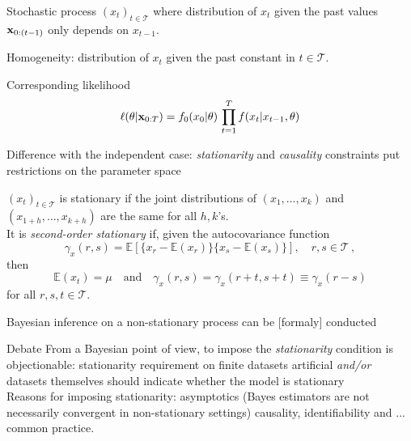 \begin{slide}
Stochastic process $(x_t)_{t\in\mathcal{T}}$
where distribution of $x_t$ given the past values $\mathbf{x}_{0:(t-1)}$
only depends on $x_{t-1}$.

Homogeneity:  distribution of $x_t$ given the past constant in
$t\in\mathcal{T}$.

\vs\pause
Corresponding likelihood
$$
\ell(\theta|\mathbf{x}_{0:T}) = f_0(x_0|\theta)\,\prod_{t=1}^T f(x_t|x_{t-1},\theta)
$$


\end{slide}\begin{slide}

Difference with the independent case: {\em stationarity} and {\em causality}
constraints put restrictions on the parameter space

\end{slide}\begin{slide}

\begin{definition}
$(x_t)_{t\in\mathcal{T}}$ is stationary if the joint distributions of
$(x_1,\ldots,x_k)$ and $(x_{1+h},\ldots,x_{k+h})$ are the same for all $h,k$'s.\\

\pause
It is {\em second-order stationary} if, given 
the autocovariance function 
$$
\gamma_x(r,s)=\mathbb{E}[\{x_r-\mathbb{E}(x_r)\}\{x_s-\mathbb{E}(x_s)\}],
\quad r,s\in \mathcal{T}\,,
$$
then
$$
\mathbb{E}(x_t)=\mu \quad\text{and}\quad \gamma_x(r,s)=\gamma_x(r+t,s+t)\equiv\gamma_x(r-s)
$$
for all $r,s,t\in\mathcal{T}$.
\end{definition}

\end{slide}\begin{slide}

Bayesian inference on a non-stationary process can be [formaly] conducted

\pause
\begin{block}{Debate}
From a Bayesian point of view, to impose the {\it stationarity} condition is objectionable:\small
stationarity requirement on finite datasets artificial {\em and/or} 
datasets themselves should indicate whether the model is stationary\\ 
\normalsize
Reasons for imposing stationarity:\small
asymptotics (Bayes estimators are not necessarily convergent in
non-stationary settings) causality, identifiability and ... common practice.\normalsize
\end{block}


\end{slide}
